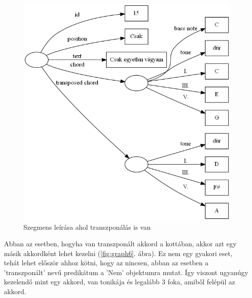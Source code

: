 \begin{figure}[h]
	\centering
	\includegraphics[scale=0.6]{images/img_src/rdf_graph_5.png}
	\caption{Szegmens leírása ahol transzponálás is van}
	\label{fig:graph5}
\end{figure}

Abban az esetben, hogyha van transzponált akkord a kottában, akkor azt egy másik akkordként lehet kezelni (\ref{fig:graph6}. ábra). Ez nem egy gyakori eset, tehát lehet először ahhoz kötni, hogy az nincsen, abban az esetben a 'transzponált' nevű predikátum a 'Nem' objektumra mutat. Így viszont ugyanúgy kezelendő mint egy akkord, van tonikája és legalább 3 foka, amiből felépül az akkord.

